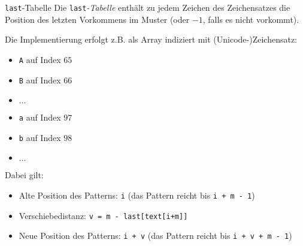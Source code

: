 \begin{defi}{\texttt{last}-Tabelle}
    Die \texttt{last}\emph{-Tabelle} enthält zu jedem Zeichen des Zeichensatzes die Position des letzten Vorkommens im Muster (oder $-1$, falls es nicht vorkommt).

    Die Implementierung erfolgt z.B. als Array indiziert mit (Unicode-)Zeichensatz:
    \begin{itemize}
        \item \texttt{A} auf Index $65$
        \item \texttt{B} auf Index $66$
        \item $\ldots$
        \item \texttt{a} auf Index $97$
        \item \texttt{b} auf Index $98$
        \item $\ldots$
    \end{itemize}

    Dabei gilt:
    \begin{itemize}
        \item Alte Position des Patterns: \texttt{i} (das Pattern reicht bis \texttt{i + m - 1})
        \item Verschiebedistanz: \texttt{v = m - last[text[i+m]]}
        \item Neue Position des Patterns: \texttt{i + v} (das Pattern reicht bis \texttt{i + v +  m - 1})
    \end{itemize}
\end{defi}

